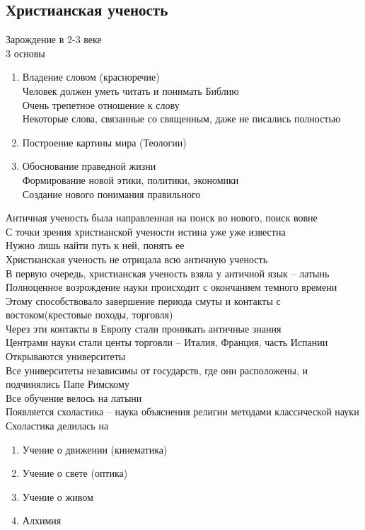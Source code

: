 \documentclass[12pt]{article}
\begin{document}
\subsection{Христианская ученость}
Зарождение в 2-3 веке\\
3 основы
\begin{enumerate}
    \item Владение словом (красноречие)\\
    Человек должен уметь читать и понимать Библию\\
    Очень трепетное отношение к слову\\
    Некоторые слова, связанные со священным, даже не писались полностью
    \item Построение картины мира (Теологии)
    \item Обоснование праведной жизни\\
    Формирование новой этики, политики, экономики\\
    Создание нового понимания правильного
\end{enumerate}
Античная ученость была направленная на поиск во нового, поиск вовне\\
С точки зрения христианской учености истина уже уже известна\\
Нужно лишь найти путь к ней, понять ее\\
Христианская ученость не отрицала всю античную ученость\\
В первую очередь, христианская ученость взяла у античной язык -- латынь\\
Полноценное возрождение науки происходит с окончанием темного времени\\
Этому способствовало завершение периода смуты и контакты с востоком(крестовые походы, торговля)\\
Через эти контакты в Европу стали проникать античные знания\\
Центрами науки стали центы торговли -- Италия, Франция, часть Испании\\
Открываются университеты\\
Все университеты независимы от государств, где они расположены, и подчинялись Папе Римскому\\
Все обучение велось на латыни\\
Появляется схоластика -- наука объяснения религии методами классической науки\\
Схоластика делилась на 
\begin{enumerate}
    \item Учение о движении (кинематика)
    \item Учение о свете (оптика)
    \item Учение о живом
    \item Алхимия
\end{enumerate}
\end{document}
